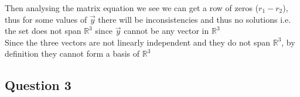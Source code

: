 \documentclass{article}
\begin{document}
\begin{enumerate}[(i)]
    Then analysing the matrix equation we see we can get a row of zeros (\(r_1 - r_2\)), thus for some values of \(\vec{y}\)
    there will be inconsistencies and thus no solutions i.e. the set does not span \(\mathbb{R}^3\) since \(\vec{y}\) cannot be
    any vector in \(\mathbb{R}^3\) 
    \\

    Since the three vectors are not linearly independent and they do not span \(\mathbb{R}^3\), by definition they 
    cannot form a basis of \(\mathbb{R}^3\)

\end{enumerate}







\subsection*{Question 3}
\end{document}
